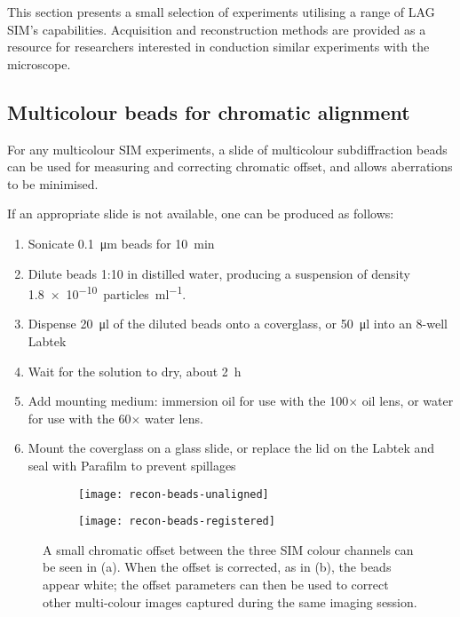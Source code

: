 This section presents a small selection of experiments utilising a range of LAG SIM's capabilities. 
Acquisition and reconstruction methods are provided as a resource for researchers interested in conduction similar experiments with the microscope. 

\subsection{Multicolour beads for chromatic alignment}
For any multicolour SIM experiments, a slide of multicolour subdiffraction beads can be used for measuring and correcting chromatic offset, and allows aberrations to be minimised. 

If an appropriate slide is not available, one can be produced as follows: 
\begin{enumerate}
	\item Sonicate \SI{0.1}{\micro\metre} beads for \SI{10}{\minute}
	\item Dilute beads 1:10 in distilled water, producing a suspension of density \SI{1.8e-10}{particles\per\milli\litre}. 
	\item Dispense \SI{20}{\micro\litre} of the diluted beads onto a coverglass, or \SI{50}{\micro\litre} into an 8-well Labtek
	\item Wait for the solution to dry, about \SI{2}{\hour}
	\item Add mounting medium: immersion oil for use with the 100$\times$ oil lens, or water for use with the 60$\times$ water lens. 
	\item Mount the coverglass on a glass slide, or replace the lid on the Labtek and seal with Parafilm to prevent spillages
\end{enumerate}

\begin{figure}[p]
\centering
\begin{subfigure}[b]{0.49\textwidth}
	\texttt{[image: recon-beads-unaligned]}
	\caption{}\label{fig:recon-beads-unaligned}
\end{subfigure}
\hfill
\begin{subfigure}[b]{0.49\textwidth}
	\texttt{[image: recon-beads-registered]}
	\caption{}\label{fig:recon-beads-registered}
\end{subfigure}
\caption[LAG SIM: Multicolour alignment beads are used for correcting chromatic offset]{A small chromatic offset between the three SIM colour channels can be seen in (a). When the offset is corrected, as in (b), the beads appear white; the offset parameters can then be used to correct other multi-colour images captured during the same imaging session.  } 
\label{fig:recon-beads}
\end{figure}

